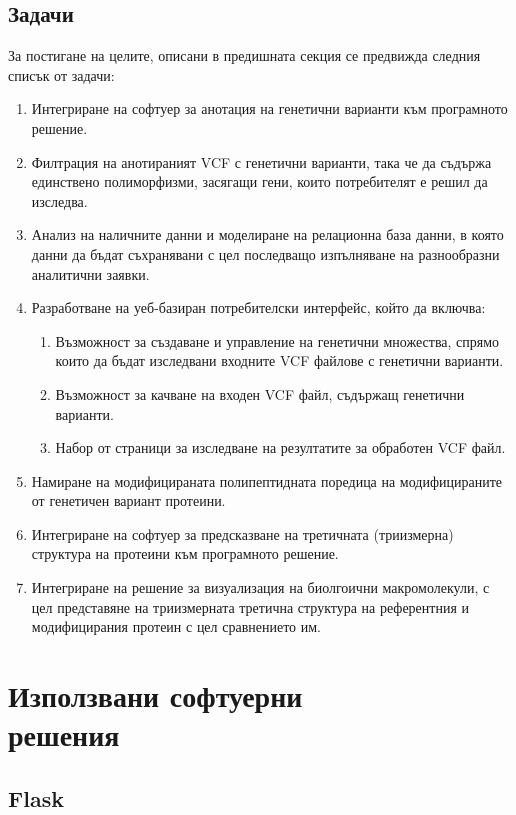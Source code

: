 \documentclass[pdftex,cyrillic,14pt,a4page,twoside]{extreport}
\begin{document}
\section{Задачи}
За постигане на целите, описани в предишната секция се предвижда следния списък от задачи:
\begin{enumerate}
	\item Интегриране на софтуер за анотация на генетични варианти към програмното решение.
	\item Филтрация на анотираният VCF с генетични варианти, така че да съдържа единствено полиморфизми, засягащи гени, които потребителят е решил да изследва.
	\item Анализ на наличните данни и моделиране на релационна база данни, в която данни да бъдат съхранявани с цел последващо изпълняване на разнообразни аналитични заявки.
	\item Разработване на уеб-базиран потребителски интерфейс, който да включва:
		\begin{enumerate}
			\item Възможност за създаване и управление на генетични множества, спрямо които да бъдат изследвани входните VCF файлове с генетични варианти.
			\item Възможност за качване на входен VCF файл, съдържащ генетични варианти.
			\item Набор от страници за изследване на резултатите за обработен VCF файл.
		\end{enumerate}
	\item Намиране на модифицираната полипептидната поредица на модифицираните от генетичен вариант протеини.
	\item Интегриране на софтуер за предсказване на третичната (триизмерна) структура на протеини към програмното решение.
	\item Интегриране на решение за визуализация на биолгоични макромолекули, с цел представяне на триизмерната третична структура на референтния и модифицирания протеин с цел сравнението им.
\end{enumerate}
\chapter[Използвани софтуерни решения]{Използвани софтуерни\\ решения}
\section{Flask}
\end{document}
